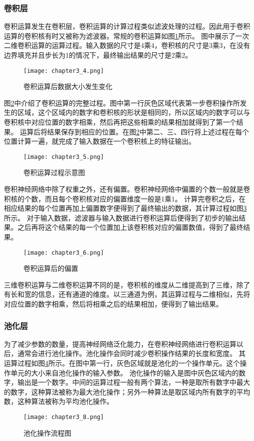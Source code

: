 \subsubsection{卷积层}
卷积运算发生在卷积层，卷积运算的计算过程类似滤波处理的过程。因此用于卷积运算的卷积核有时又被称为滤波器。常规的卷积运算如图\ref{fig:chapter3_4}所示。
图中展示了一次二维卷积运算的运算过程。输入数据的尺寸是4乘4，卷积核的尺寸是3乘3，在没有边界填充并且步长为1的情况下，最终输出结果的尺寸是2乘2。
\begin{figure}
    \centering
    \texttt{[image: chapter3\_4.png]}
    \caption{卷积运算后数据大小发生变化}
    \label{fig:chapter3_4}
\end{figure}

图\ref{fig:chapter3_5}中介绍了卷积运算的完整过程。图中第一行灰色区域代表第一步卷积操作所发生的区域，这个区域内的数字和卷积核的形状是相同的，所以区域内的数字可以与卷积核中对应位置的数字相乘，然后再把这些相乘的结果相加就得到了第一个结果。
运算后将结果保存到相应的位置。在图\ref{fig:chapter3_5}中第二、三、四行将上述过程在每个位置计算一遍，就完成了输入数据在一个卷积核上的特征输出。
\begin{figure}
    \centering
    \texttt{[image: chapter3\_5.png]}
    \caption{卷积运算过程示意图}
    \label{fig:chapter3_5}
\end{figure}

卷积神经网络中除了权重之外，还有偏置。卷积神经网络中偏置的个数一般就是卷积核的个数，而且每个卷积核对应的偏置维度一般是1乘1。
计算完卷积之后，在相应结果的每个位置再加上偏置数字便得到了最终输出的数据，其计算过程如图\ref{fig:chapter3_6}所示。
对于输入数据，滤波器与输入数据进行卷积运算后便得到了初步的输出结果。之后再将这个结果的每一个位置加上该卷积核对应的偏置数值，得到了最终结果。
\begin{figure}
    \centering
    \texttt{[image: chapter3\_6.png]}
    \caption{卷积运算后的偏置}
    \label{fig:chapter3_6}
\end{figure}

三维卷积运算与二维卷积运算不同的是，卷积核的维度从二维提高到了三维，除了有长和宽的信息，还有通道的维度。以三通道为例，其运算过程与二维相似，先将对应位置的数字相乘，然后将相乘之后的结果相加，便得到了输出结果。

\subsubsection{池化层}
为了减少参数的数量，提高神经网络泛化能力，在卷积神经网络进行卷积运算以后，通常会进行池化操作。池化操作会同时减少卷积操作结果的长度和宽度。
其运算过程如图\ref{fig:chapter3_8}所示。在图中第一行，灰色区域就是池化的一个操作单元。这个操作单元的大小来自池化操作的输入参数。
池化操作的输入是图中灰色区域内的数字，输出是一个数字。中间的运算过程一般有两个算法，一种是取所有数字中最大的数字，这种算法被称为最大池化操作；另外一种算法是取区域内所有数字的平均数，这种算法被称为平均池化操作。
\begin{figure}
    \centering
    \texttt{[image: chapter3\_8.png]}
    \caption{池化操作流程图}
    \label{fig:chapter3_8}
\end{figure}

